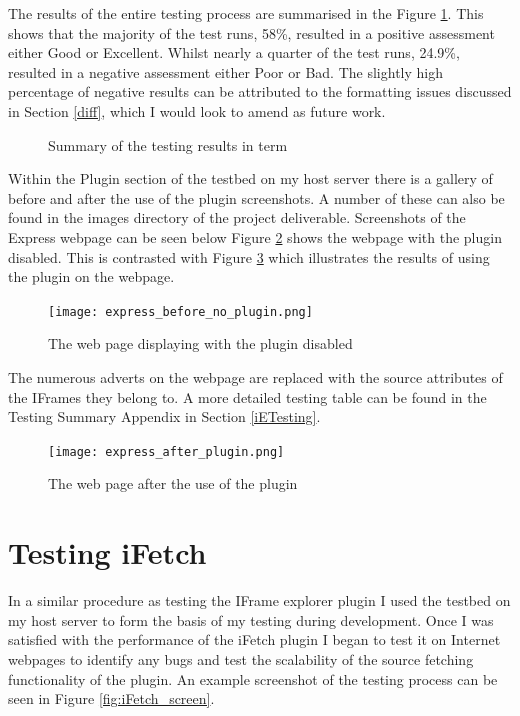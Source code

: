 \documentclass[12pt]{article}
\begin{document}
The results of the entire testing process are summarised in the Figure \ref{fig:iePie}. This shows that the majority of the test runs, 58\%, resulted in a positive assessment either Good or Excellent. Whilst nearly a quarter of the test runs, 24.9\%, resulted in a negative assessment either Poor or Bad. The slightly high percentage of negative results can be attributed to the formatting issues discussed in Section \ref{diff}, which I would look to amend as future work. 

\begin{figure} [H]
    \centering
        \caption{Summary of the testing results in term}
        \label{fig:iePie}
\end{figure}


Within the Plugin section of the testbed on my host server there is a gallery of before and after the use of the plugin screenshots. A number of these can also be found in the images directory of the project deliverable. Screenshots of the Express webpage can be seen below Figure \ref{fig:express_before_no_plugin} shows the webpage with the plugin disabled. This is contrasted with Figure \ref{fig:express_after_plugin} which illustrates the results of using the plugin on the webpage. 

\begin{figure}[H]
    \centering
    \texttt{[image: express\_before\_no\_plugin.png]}
    \caption{The web page displaying with the plugin disabled}
    \label{fig:express_before_no_plugin}
\end{figure}

The numerous adverts on the webpage are replaced with the source attributes of the IFrames they belong to. A more detailed testing table can be found in the Testing Summary Appendix in Section \ref{iETesting}.  

\begin{figure}[H]
    \centering
    \texttt{[image: express\_after\_plugin.png]}
    \caption{The web page after the use of the plugin}
    \label{fig:express_after_plugin}
\end{figure}

\section{Testing iFetch}
In a similar procedure as testing the IFrame explorer plugin I used the testbed on my host server to form the basis of my testing during development. Once I was satisfied with the performance of the iFetch plugin I began to test it on Internet webpages to identify any bugs and test the scalability of the source fetching functionality of the plugin. An example screenshot of the testing process can be seen in Figure \ref{fig:iFetch_screen}.  
\end{document}
